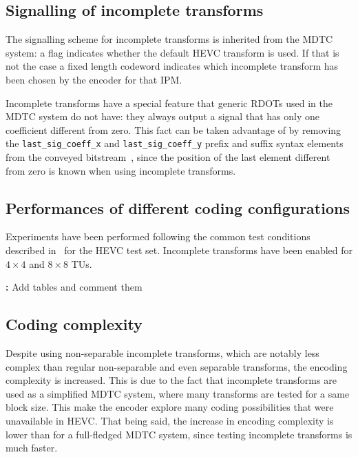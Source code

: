 \documentclass[11pt,a4paper,openright,twoside]{book}
\providecommand{\todo}[1]{
	\begin{center}
		\colorbox{yellowish}{
			\begin{minipage}{0.95\linewidth}
				\textbf{\color{redish}{TODO}:} #1
			\end{minipage}
		}
	\end{center}
}
\numberwithin{equation}{section} %
\numberwithin{figure}{section} %
\numberwithin{table}{section} %
\begin{document}
\subsection{Signalling of incomplete transforms}
\label{sub:it_signalling}

The signalling scheme for incomplete transforms is inherited from the
\ac{MDTC} system:
a flag indicates whether the default \ac{HEVC} transform is used.
If that is not the case a fixed length codeword indicates which incomplete
transform has been chosen by the encoder for that \ac{IPM}.

Incomplete transforms have a special feature that generic \acp{RDOT} used in
the \ac{MDTC} system do not have:
they always output a signal that has only one coefficient different from zero.
This fact can be taken advantage of by removing the
\texttt{last\_sig\_coeff\_x} and \texttt{last\_sig\_coeff\_y} prefix and
suffix syntax elements from the conveyed bitstream~\cite{JCTVC-G704}, since
the position of the last element different from zero is known when using
incomplete transforms.

\subsection{Performances of different coding configurations}
\label{sub:it_performances}

Experiments have been performed following the common test conditions described
in~\cite{bossen-12-common-test-conditions} for the \ac{HEVC} test set.
Incomplete transforms have been enabled for $4\times4$ and $8\times8$
\acp{TU}.

\todo{Add tables and comment them}

\subsection{Coding complexity}
\label{sub:it_coding_complexity}

Despite using non-separable incomplete transforms, which are notably less
complex than regular non-separable and even separable transforms, the encoding
complexity is increased.
This is due to the fact that incomplete transforms are used as a simplified
\ac{MDTC} system, where many transforms are tested for a same block size.
This make the encoder explore many coding possibilities that were unavailable
in \ac{HEVC}.
That being said, the increase in encoding complexity is lower than for a
full-fledged \ac{MDTC} system, since testing incomplete transforms is much
faster.
\end{document}
